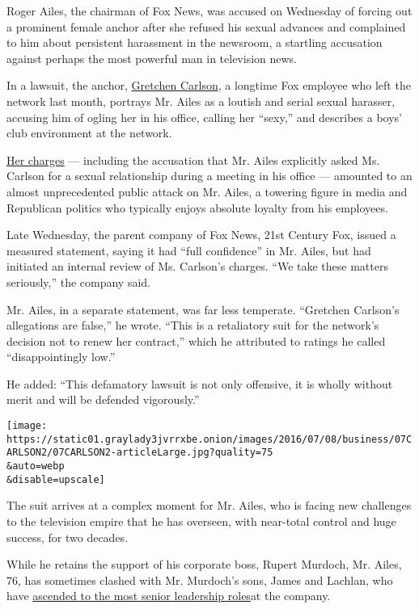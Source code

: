 Roger Ailes, the chairman of Fox News, was accused on Wednesday of
forcing out a prominent female anchor after she refused his sexual
advances and complained to him about persistent harassment in the
newsroom, a startling accusation against perhaps the most powerful man
in television news.

In a lawsuit, the anchor,
\href{http://www.nytimes3xbfgragh.onion/2016/07/07/business/media/gretchen-carlson-files-sex-harassment-suit-against-roger-ailes-of-fox-news.html}{Gretchen
Carlson}, a longtime Fox employee who left the network last month,
portrays Mr. Ailes as a loutish and serial sexual harasser, accusing him
of ogling her in his office, calling her ``sexy,'' and describes a boys'
club environment at the network.

\href{http://www.nytimes3xbfgragh.onion/interactive/2016/07/06/business/media/document-Carlson-Complaint-Filed.html}{Her
charges} --- including the accusation that Mr. Ailes explicitly asked
Ms. Carlson for a sexual relationship during a meeting in his office ---
amounted to an almost unprecedented public attack on Mr. Ailes, a
towering figure in media and Republican politics who typically enjoys
absolute loyalty from his employees.

Late Wednesday, the parent company of Fox News, 21st Century Fox, issued
a measured statement, saying it had ``full confidence'' in Mr. Ailes,
but had initiated an internal review of Ms. Carlson's charges. ``We take
these matters seriously,'' the company said.

Mr. Ailes, in a separate statement, was far less temperate. ``Gretchen
Carlson's allegations are false,'' he wrote. ``This is a retaliatory
suit for the network's decision not to renew her contract,'' which he
attributed to ratings he called ``disappointingly low.''

He added: ``This defamatory lawsuit is not only offensive, it is wholly
without merit and will be defended vigorously.''

\texttt{[image: https://static01.graylady3jvrrxbe.onion/images/2016/07/08/business/07CARLSON2/07CARLSON2-articleLarge.jpg?quality=75\\\&auto=webp\\\&disable=upscale]}

The suit arrives at a complex moment for Mr. Ailes, who is facing new
challenges to the television empire that he has overseen, with
near-total control and huge success, for two decades.

While he retains the support of his corporate boss, Rupert Murdoch, Mr.
Ailes, 76, has sometimes clashed with Mr. Murdoch's sons, James and
Lachlan, who have
\href{http://www.nytimes3xbfgragh.onion/2015/06/26/business/media/roger-ailes-signs-new-contract-to-head-fox-news-and-stations.html}{ascended
to the most senior leadership roles}at the company.

